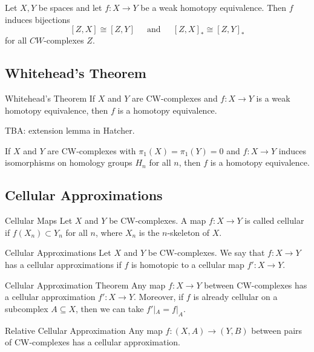 \documentclass[a4paper]{article}
\begin{document}
\begin{prp}{}{} Let $X,Y$ be spaces and let $f:X\to Y$ be a weak homotopy equivalence. Then $f$ induces bijections $$[Z,X]\cong[Z,Y]\;\;\;\;\text{ and }\;\;\;\;[Z,X]_\ast\cong[Z,Y]_\ast$$ for all $CW$-complexes $Z$. 
\end{prp}

\subsection{Whitehead's Theorem}
\begin{thm}{Whitehead's Theorem}{} If $X$ and $Y$ are CW-complexes and $f:X\to Y$ is a weak homotopy equivalence, then $f$ is a homotopy equivalence. 
\end{thm}

TBA: extension lemma in Hatcher. 

\begin{crl}{}{} If $X$ and $Y$ are CW-complexes with $\pi_1(X)=\pi_1(Y)=0$ and $f:X\to Y$ induces isomorphisms on homology groups $H_n$ for all $n$, then $f$ is a homotopy equivalence. 
\end{crl}

\subsection{Cellular Approximations}
\begin{defn}{Cellular Maps}{} Let $X$ and $Y$ be CW-complexes. A map $f:X\to Y$ is called cellular if $f(X_n)\subset Y_n$ for all $n$, where $X_n$ is the $n$-skeleton of $X$. 
\end{defn}

\begin{defn}{Cellular Approximations}{} Let $X$ and $Y$ be CW-complexes. We say that $f:X\to Y$ has a cellular approximations if $f$ is homotopic to a cellular map $f':X\to Y$. 
\end{defn}

\begin{thm}{Cellular Approximation Theorem}{} Any map $f:X\to Y$ between CW-complexes has a cellular approximation $f':X\to Y$. Moreover, if $f$ is already cellular on a subcomplex $A\subseteq X$, then we can take $f'|_A=f|_A$. 
\end{thm}

\begin{thm}{Relative Cellular Approximation}{} Any map $f:(X,A)\to (Y,B)$ between pairs of CW-complexes has a cellular approximation. 
\end{thm}
\end{document}
